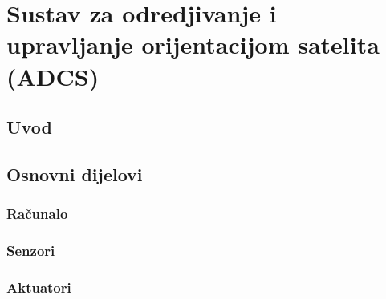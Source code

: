 \documentclass[times, utf8, diplomski, numeric]{templates/template}
\begin{document}
\chapter{Sustav za odredjivanje i upravljanje orijentacijom satelita (ADCS)}{
    \section{Uvod}{
        \iffalse
        - sto je sustav za odredjivanje i upravljanje orijentacijom satelita
            - navesti englesku skracenicu (koristi eng u latexu, vidi dokumentaciju pri dnu)
        - koja je zadaca sustava za odredjivanje a koja sustava za upravljanje orijentacijom satelita
        - zasto je on jedan od najvaznijih sustava satelita
            - sto se desava ako sustav prestane raditi ili radi nenormalno
                - navesti neke primjere
        - Zasto nam je bitna orijentacija
            - korisni teret satelita
                - navesti neke korisne terete/sustave koji ovise o orijentaciji satelita
                - u ovisnosti o teretu, objasniti koje vrste orijentacije koristimo (npr antena prati zemlju, itd)
        \fi
    }

    \section{Osnovni dijelovi}{
        \subsection{Računalo}{
            \iffalse
            - prikupljanje podataka
            - obrada podataka
            - kontrola orijentacije
            - komunikacija
            \fi
        }

        \subsection{Senzori}{
            \iffalse
            - koji sve postoje
            - na kojem principima rade
            - navesti neke tehnicke podatke svakog
            - napraviti usporedbu izmedju njih
                - cijena
                - preciznost
                - uvijeti rada
                - dostupnost
                - jednostavnost
                - potrosnja
            \fi
        }

        \subsection{Aktuatori}{
            \iffalse
            - koji sve postoje
            - na kojim principima rade
            - tehnicki podatci
            - usporedba izmedju njih
                - cijena
                - preciznost
                - uvijeti rada
                - dostupnost
                - jednostavnost
                - potrosnja
            \fi
        }
    }

}
\end{document}
